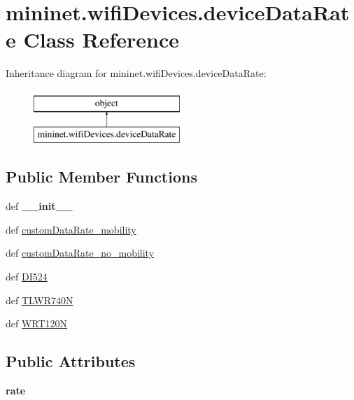 \hypertarget{classmininet_1_1wifiDevices_1_1deviceDataRate}{\section{mininet.\-wifi\-Devices.\-device\-Data\-Rate Class Reference}
\label{classmininet_1_1wifiDevices_1_1deviceDataRate}
}
Inheritance diagram for mininet.\-wifi\-Devices.\-device\-Data\-Rate\-:\begin{figure}[H]
\begin{center}
\leavevmode
\includegraphics[height=2.000000cm]{classmininet_1_1wifiDevices_1_1deviceDataRate}
\end{center}
\end{figure}
\subsection*{Public Member Functions}
\begin{DoxyCompactItemize}
\item 
\hypertarget{classmininet_1_1wifiDevices_1_1deviceDataRate_a4fec299443675f5f03329b2265f13f5d}{def {\bfseries \-\_\-\-\_\-init\-\_\-\-\_\-}}\label{classmininet_1_1wifiDevices_1_1deviceDataRate_a4fec299443675f5f03329b2265f13f5d}

\item 
def \hyperlink{classmininet_1_1wifiDevices_1_1deviceDataRate_a90f2be44dbbb1551f568b80dc0d002f8}{custom\-Data\-Rate\-\_\-mobility}
\item 
def \hyperlink{classmininet_1_1wifiDevices_1_1deviceDataRate_ab29cfdb142580593f09f4c8b112a5512}{custom\-Data\-Rate\-\_\-no\-\_\-mobility}
\item 
def \hyperlink{classmininet_1_1wifiDevices_1_1deviceDataRate_ab2be9df8a52b025219584371b39fadf7}{D\-I524}
\item 
def \hyperlink{classmininet_1_1wifiDevices_1_1deviceDataRate_a79fa9b37c33e24e8fc8ffd6c2cb45a98}{T\-L\-W\-R740\-N}
\item 
def \hyperlink{classmininet_1_1wifiDevices_1_1deviceDataRate_a97ca6b84adfb0cb4f02d826219cdab80}{W\-R\-T120\-N}
\end{DoxyCompactItemize}
\subsection*{Public Attributes}
\begin{DoxyCompactItemize}
\item 
\hypertarget{classmininet_1_1wifiDevices_1_1deviceDataRate_ac0c77c60bdc09f6cc259794e10662ffd}{{\bfseries rate}}\label{classmininet_1_1wifiDevices_1_1deviceDataRate_ac0c77c60bdc09f6cc259794e10662ffd}

\end{DoxyCompactItemize}
